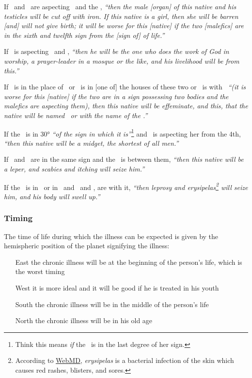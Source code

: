 If  \Mars\, and \Saturn\, are aspecting \Venus\, and the \Moon, \textsl{``then the male [organ] of this native and his testicles will be cut off with iron. If this native is a girl, then she will be barren [and] will not give birth; it will be worse for this [native] if the two [malefics] are in the sixth and twelfth sign from the [sign of] of life.''}

If  \Jupiter\, is aspecting \Mars\, and \Saturn, \textsl{``then he will be the one who does the work of God in worship, a prayer-leader in a mosque or the like, and his livelihood will be from this.''}

If  \Jupiter\, is in the place of \Venus\, or \Mercury\, is in [one of] the houses of these two or \Mercury\, is with \Jupiter\, \textsl{``(it is worse for this [native] if the two are in a sign possessing two bodies and the malefics are aspecting them), then this native will be effeminate, and this, that the native will be named \Mercury\, or with the name of the \Moon.''}

If  the \Moon\, is in 30° \textsl{``of the sign in which it is''}\footnote{Think this means \textsl{if} the \Moon\, is in the last degree of her sign.} and \Saturn\, is aspecting her from the 4th, \textsl{``then this native will be a midget, the shortest of all men.''}

If  \Saturn\, and \Mars\, are in the same sign and the \Moon\, is between them, \textsl{``then this native will be a leper, and scabies and itching will seize him.''}

If  the \Moon\, is in \Aries\, or in \Taurus\, and \Saturn\, and \Mars, are with it,  \textsl{``then leprosy and erysipelas\footnote{According to \href{https://www.webmd.com/skin-problems-and-treatments/what-is-erysipelas}{WebMD}, \textsl{erysipelas} is a bacterial infection of the skin which causes red rashes, blisters, and sores.} will seize him, and his body will swell up.''}

\subsubsection{Timing}

The  time of life during which the illness can be expected is given by the hemispheric position of the planet signifying the illness: 

\begin{itemize}[topsep=0em,itemsep=0em]
\item[East] the chronic illness will be at the beginning of the person's life, which is the worst timing
\item[West] it is more ideal and it will be good if he is treated in his youth
\item[South] the chronic illness will be in the middle of the person's life
\item[North] the chronic illness will be in his old age
\end{itemize}






